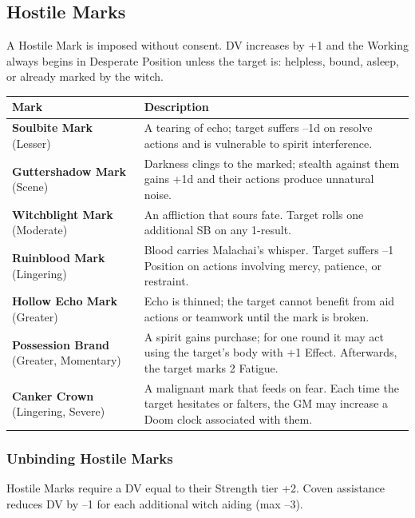 \documentclass[11pt]{book}
\begin{document}
\subsection*{Hostile Marks}

A Hostile Mark is imposed without consent.  
DV increases by +1 and the Working always begins in Desperate Position unless the target is:
helpless, bound, asleep, or already marked by the witch.

\begin{center}
\begin{longtable}{p{} p{}}
\toprule
\textbf{Mark} & \textbf{Description} \\
\midrule

\textbf{Soulbite Mark} (Lesser) &
A tearing of echo; target suffers --1d on resolve actions and is vulnerable to spirit interference. \\

\textbf{Guttershadow Mark} (Scene) &
Darkness clings to the marked; stealth against them gains +1d and their actions produce unnatural noise. \\

\textbf{Witchblight Mark} (Moderate) &
An affliction that sours fate. Target rolls one additional SB on any 1-result. \\

\textbf{Ruinblood Mark} (Lingering) &
Blood carries Malachai's whisper. Target suffers --1 Position on actions involving mercy, patience, or restraint. \\

\textbf{Hollow Echo Mark} (Greater) &
Echo is thinned; the target cannot benefit from aid actions or teamwork until the mark is broken. \\

\textbf{Possession Brand} (Greater, Momentary) &
A spirit gains purchase; for one round it may act using the target's body with +1 Effect. Afterwards, the target marks 2 Fatigue. \\

\textbf{Canker Crown} (Lingering, Severe) &
A malignant mark that feeds on fear. Each time the target hesitates or falters, the GM may increase a Doom clock associated with them. \\

\bottomrule
\end{longtable}
\end{center}

\subsubsection*{Unbinding Hostile Marks}
Hostile Marks require a DV equal to their Strength tier +2.  
Coven assistance reduces DV by --1 for each additional witch aiding (max --3).
\end{document}
